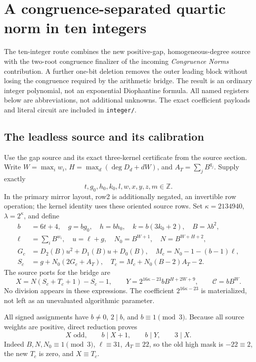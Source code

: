\section{A congruence-separated quartic norm in ten integers}
\label{sec:round9-integer}

The ten-integer route combines the new positive-gap, homogeneous-degree
source with the two-root congruence finalizer of the incoming
\emph{Congruence Norms} contribution. A further one-bit deletion removes
the outer leading block without losing the congruence required by the
arithmetic bridge. The result is an ordinary integer polynomial, not an
exponential Diophantine formula. All named registers below are abbreviations,
not additional unknowns. The exact coefficient payloads and literal circuit
are included in \texttt{integer/}.

\subsection{The leadless source and its calibration}

Use the gap source and its exact three-kernel certificate from the source
section. Write $W=\max_i w_i$, $H=\max_d(\deg D_d+dW)$, and
$A_T=\sum_jB^{q_j}$. Supply exactly
\[
 t,g_0,h_0,k_0,l,w,x,y,z,m\in\mathbb Z.
\]
In the primary mirror layout, row2 is additionally negated, an invertible
row operation; the kernel identity uses these oriented source rows.
Set $\kappa=2134940$, $\lambda=2^\kappa$, and define
{\small
\begin{align*}
 b&=6t+4,\quad g=bg_0,\quad h=bh_0,\quad k=b(3k_0+2),\quad B=\lambda b^2,\\
 \ell&=\sum_i B^{w_i},\quad u=\ell+g,\quad N_0=B^{W+1},\quad N=B^{W+H+2},\\
 G_c&=D_2(B)u^2+D_1(B)u+D_0(B),\quad M_c=N_0-1-(b-1)\ell,\\
 S_c&=g+N_0(2G_c+A_T),\quad T_c=M_c+N_0(B-2)A_T-2.
\end{align*}
}
The source ports for the bridge are
\begin{equation}\label{eq:r9-ten-source}
 \boxed{\quad X=N(S_c+T_c+1)-S_c-1,\qquad
 Y=2^{16\kappa-23}bB^{H+2W+9},\qquad
 \mathcal C=bB^W.\quad}
\end{equation}
No division appears in these expressions. The coefficient $2^{16\kappa-23}$
is materialized, not left as an unevaluated algorithmic parameter.

All signed assignments have $b\ne0$, $2\mid b$, and $b\equiv1\pmod3$.
Because all source weights are positive, direct reduction proves
\[
 X\text{ odd},\qquad b\mid X+1,\qquad b\mid Y,\qquad 3\mid X.
\]
Indeed $B,N,N_0\equiv1\pmod3$, $\ell\equiv31$, $A_T\equiv22$, so the
old high mask is $-22\equiv2$, the new $T_c$ is zero, and $X\equiv T_c$.

